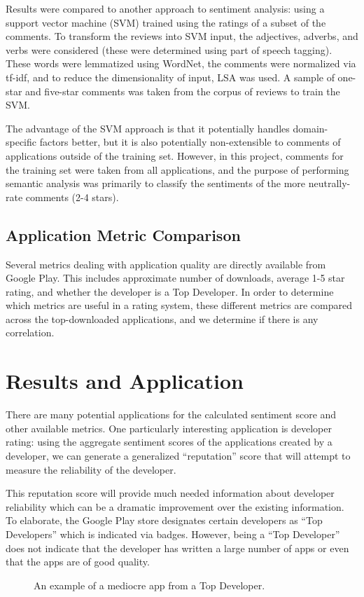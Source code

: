 \documentclass{acm_proc_article-sp}
\begin{document}
Results were compared to another approach to sentiment analysis: using a support vector machine (SVM) trained using the ratings of a subset of the comments.  To transform the reviews into SVM input, the adjectives, adverbs, and verbs were considered (these were determined using part of speech tagging).  These words were lemmatized using WordNet, the comments were normalized via tf-idf, and to reduce the dimensionality of input, LSA was used.  A sample of one-star and five-star comments was taken from the corpus of reviews to train the SVM.

The advantage of the SVM approach is that it potentially handles domain-specific factors better, but it is also potentially non-extensible to comments of applications outside of the training set.  However, in this project, comments for the training set were taken from all applications, and the purpose of performing semantic analysis was primarily to classify the sentiments of the more neutrally-rate comments (2-4 stars).


\subsection{Application Metric Comparison}
Several metrics dealing with application quality are directly available from Google Play.  This includes approximate number of downloads, average 1-5 star rating, and whether the developer is a Top Developer.  In order to determine which metrics are useful in a rating system, these different metrics are compared across the top-downloaded applications, and we determine if there is any correlation.

\section{Results and Application}
There are many potential applications for the calculated sentiment score and other available metrics. One particularly interesting application is developer rating: using the aggregate sentiment scores of the applications created by a developer, we can generate a generalized ``reputation'' score that will attempt to measure the reliability of the developer.

 This reputation score will provide much needed information about developer reliability which can be a dramatic improvement over the existing information. To elaborate, the Google Play store designates certain developers as ``Top Developers'' which is indicated via badges. However, being a ``Top Developer'' does not indicate that the developer has written a large number of apps or even that the apps are of good quality.
\begin{figure}[!h]
\centering
{}
\caption{An example of a mediocre app from a Top Developer.}
\label{fig:myfig}
\end{figure} 
\end{document}
